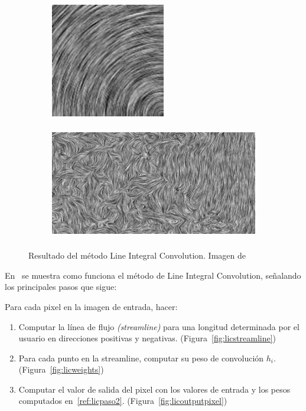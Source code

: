 \begin{figure}[h!]
	\centering	
	\begin{subfigure}{.45\textwidth}
		\includegraphics[height=5cm,width=\textwidth]{figures/lic2.png}
	\end{subfigure}
	\hfill
	\begin{subfigure}{.45\textwidth}
		\includegraphics[height=5cm,width=\textwidth]{figures/lic1.png}
	\end{subfigure}
	\caption{Resultado del método Line Integral Convolution. Imagen
	de~\citet{osti_10185520}}
	\label{fig:lic}
\end{figure}

En~\citet{licthesis} se muestra como funciona el método de Line Integral
Convolution, señalando los principales pasos que sigue:

Para cada pixel en la imagen de entrada, hacer:
\begin{enumerate}
		\item Computar la línea de flujo \textit{(streamline)} para una longitud
				determinada por el usuario en direcciones positivas y
				negativas. (Figura~\ref{fig:licstreamline})
		\item \label{ref:licpaso2} Para cada punto en la streamline, computar su
				peso de convolución $h_i$. (Figura~\ref{fig:licweights})
		\item Computar el valor de salida del pixel con los valores de entrada y
				los pesos computados en~\ref{ref:licpaso2}.
				(Figura~\ref{fig:licoutputpixel})
\end{enumerate}

